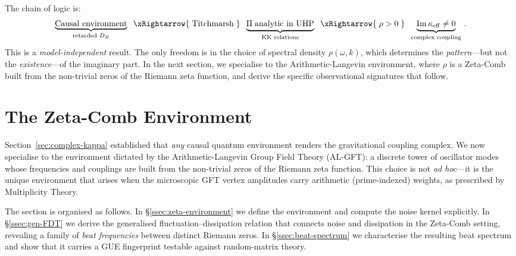 \documentclass[12pt,a4paper]{article}
\begin{document}
The chain of logic is:
\begin{equation}\label{eq:logic-chain}
  \underbrace{\text{Causal environment}}_{\text{retarded }D_{R}}
  \;\;\xRightarrow{\;\text{Titchmarsh}\;}
  \;\;\underbrace{\Pi\;\text{analytic in UHP}}_{\text{KK relations}}
  \;\;\xRightarrow{\;\rho>0\;}
  \;\;\underbrace{\mathrm{Im}\,\kappa_{\mathrm{eff}}\neq 0}_{\text{complex coupling}}\,.
\end{equation}
This is a \emph{model-independent} result.  The only freedom is in
the choice of spectral density $\rho(\omega,k)$, which determines the
\emph{pattern}---but not the \emph{existence}---of the imaginary part.
In the next section, we specialise to the Arithmetic-Langevin
environment, where $\rho$ is a Zeta-Comb built from the non-trivial
zeros of the Riemann zeta function, and derive the specific
observational signatures that follow.



\section{The Zeta-Comb Environment}\label{sec:zeta-comb}

Section~\ref{sec:complex-kappa} established that \emph{any} causal
quantum environment renders the gravitational coupling complex.  We now
specialise to the environment dictated by the Arithmetic-Langevin
Group Field Theory (AL-GFT): a discrete tower of oscillator modes
whose frequencies and couplings are built from the non-trivial zeros
of the Riemann zeta function.  This choice is not
\emph{ad hoc}---it is the unique environment that arises when the
microscopic GFT vertex amplitudes carry arithmetic (prime-indexed)
weights, as prescribed by Multiplicity Theory.

The section is organised as follows.
In \S\ref{ssec:zeta-environment} we define the environment and
compute the noise kernel explicitly.
In \S\ref{ssec:gen-FDT} we derive the generalised
fluctuation--dissipation relation that connects noise and dissipation
in the Zeta-Comb setting, revealing a family of \emph{beat
  frequencies} between distinct Riemann zeros.
In \S\ref{ssec:beat-spectrum} we characterise the resulting beat
spectrum and show that it carries a GUE fingerprint testable against
random-matrix theory.
\end{document}
